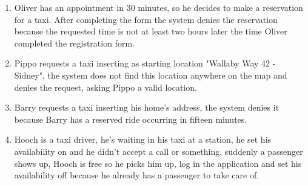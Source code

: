 \begin{enumerate}
	\item Oliver has an appointment in 30 minutes, so he decides to make a reservation for a taxi. After completing the form the system denies the reservation because the requested time is not at least two hours later the time Oliver completed the registration form.
	
	\item Pippo requests a taxi inserting as starting location "Wallaby Way 42 - Sidney", the system does not find this location anywhere on the map and denies the request, asking Pippo a valid location.
	
	\item Barry requests a taxi inserting his home's address, the system denies it because Barry has a reserved ride occurring in fifteen minutes.
	
	\item Hooch is a taxi driver, he's waiting in his taxi at a station, he set his availability on and he didn't accept a call or something, suddenly a passenger shows up, Hooch is free so he picks him up, log in the application and set his availability off because he already has a passenger to take care of.
	
\end{enumerate}